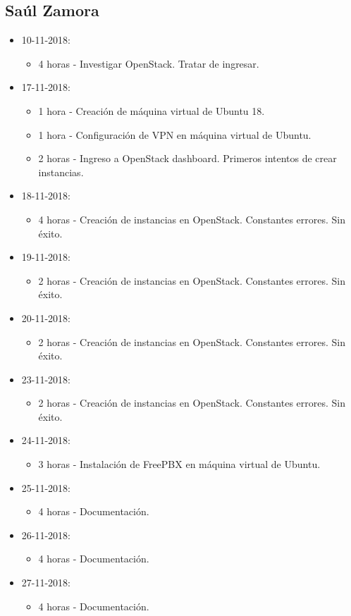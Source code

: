 \documentclass{article}
\begin{document}
\subsection{Sa\'ul Zamora}
\begin{itemize}
  \item 10-11-2018:
  \begin{itemize}
    \item 4 horas - Investigar OpenStack. Tratar de ingresar.
  \end{itemize}
  \item 17-11-2018:
  \begin{itemize}
    \item 1 hora - Creaci\'on de m\'aquina virtual de Ubuntu 18.
    \item 1 hora - Configuraci\'on de VPN en m\'aquina virtual de Ubuntu.
    \item 2 horas - Ingreso a OpenStack dashboard. Primeros intentos de crear instancias.
  \end{itemize}
  \item 18-11-2018:
  \begin{itemize}
    \item 4 horas - Creaci\'on de instancias en OpenStack. Constantes errores. Sin \'exito.
  \end{itemize}
  \item 19-11-2018:
  \begin{itemize}
    \item 2 horas - Creaci\'on de instancias en OpenStack. Constantes errores. Sin \'exito.
  \end{itemize}
  \item 20-11-2018:
  \begin{itemize}
    \item 2 horas - Creaci\'on de instancias en OpenStack. Constantes errores. Sin \'exito.
  \end{itemize}
  \item 23-11-2018:
  \begin{itemize}
    \item 2 horas - Creaci\'on de instancias en OpenStack. Constantes errores. Sin \'exito.
  \end{itemize}
  \item 24-11-2018:
  \begin{itemize}
    \item 3 horas - Instalaci\'on de FreePBX en m\'aquina virtual de Ubuntu.
  \end{itemize}
  \item 25-11-2018:
  \begin{itemize}
    \item 4 horas - Documentaci\'on.
  \end{itemize}
  \item 26-11-2018:
  \begin{itemize}
    \item 4 horas - Documentaci\'on.
  \end{itemize}
  \item 27-11-2018:
  \begin{itemize}
    \item 4 horas - Documentaci\'on.
  \end{itemize}
\end{itemize}
\end{document}
